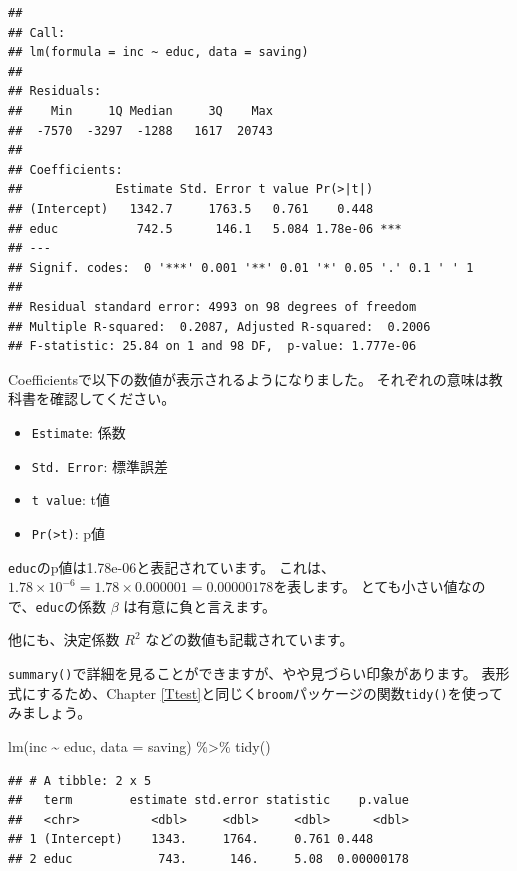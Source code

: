 \documentclass[
]{book}
\newenvironment{Shaded}{\begin{snugshade}}{\end{snugshade}}
\newcommand{\AttributeTok}[1]{\textcolor[rgb]{0.77,0.63,0.00}{#1}}
\newcommand{\FunctionTok}[1]{\textcolor[rgb]{0.00,0.00,0.00}{#1}}
\newcommand{\NormalTok}[1]{#1}
\newcommand{\SpecialCharTok}[1]{\textcolor[rgb]{0.00,0.00,0.00}{#1}}
\providecommand{\tightlist}{%
  \setlength{\itemsep}{0pt}\setlength{\parskip}{0pt}}
\begin{document}
\begin{verbatim}
## 
## Call:
## lm(formula = inc ~ educ, data = saving)
## 
## Residuals:
##    Min     1Q Median     3Q    Max 
##  -7570  -3297  -1288   1617  20743 
## 
## Coefficients:
##             Estimate Std. Error t value Pr(>|t|)    
## (Intercept)   1342.7     1763.5   0.761    0.448    
## educ           742.5      146.1   5.084 1.78e-06 ***
## ---
## Signif. codes:  0 '***' 0.001 '**' 0.01 '*' 0.05 '.' 0.1 ' ' 1
## 
## Residual standard error: 4993 on 98 degrees of freedom
## Multiple R-squared:  0.2087, Adjusted R-squared:  0.2006 
## F-statistic: 25.84 on 1 and 98 DF,  p-value: 1.777e-06
\end{verbatim}

Coefficientsで以下の数値が表示されるようになりました。
それぞれの意味は教科書を確認してください。

\begin{itemize}
\tightlist
\item
  \texttt{Estimate}: 係数
\item
  \texttt{Std.\ Error}: 標準誤差
\item
  \texttt{t\ value}: t値
\item
  \texttt{Pr(\textgreater{}\textbar{}t\textbar{})}: p値
\end{itemize}

\texttt{educ}のp値は1.78e-06と表記されています。
これは、\(1.78 \times 10^{-6} = 1.78 \times 0.000001 = 0.00000178\)を表します。
とても小さい値なので、\texttt{educ}の係数 \(\beta\) は有意に負と言えます。

他にも、決定係数 \(R^2\) などの数値も記載されています。

\texttt{summary()}で詳細を見ることができますが、やや見づらい印象があります。
表形式にするため、Chapter \ref{Ttest}と同じく\texttt{broom}パッケージの関数\texttt{tidy()}を使ってみましょう。

\begin{Shaded}
\begin{Highlighting}[]
\FunctionTok{lm}\NormalTok{(inc }\SpecialCharTok{\textasciitilde{}}\NormalTok{ educ, }\AttributeTok{data =}\NormalTok{ saving) }\SpecialCharTok{\%\textgreater{}\%}
  \FunctionTok{tidy}\NormalTok{()}
\end{Highlighting}
\end{Shaded}

\begin{verbatim}
## # A tibble: 2 x 5
##   term        estimate std.error statistic    p.value
##   <chr>          <dbl>     <dbl>     <dbl>      <dbl>
## 1 (Intercept)    1343.     1764.     0.761 0.448     
## 2 educ            743.      146.     5.08  0.00000178
\end{verbatim}
\end{document}

